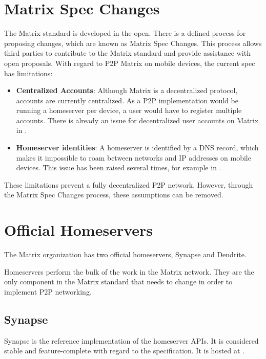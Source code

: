 \section{Matrix Spec Changes}
The Matrix standard is developed in the open.
There is a defined process for proposing changes, which are known as Matrix Spec Changes\cite{matrix_org_spec_changes}.
This process allows third parties to contribute to the Matrix standard and provide assistance with open proposals.
With regard to \ac{P2P} Matrix on mobile devices, the current spec has limitations:
\begin{itemize}
      \item{
            \textbf{Centralized Accounts}:
            Although Matrix is a decentralized protocol, accounts are currently centralized.
            As a \ac{P2P} implementation would be running a homeserver per device, a user would have to register multiple accounts.
            There is already an issue for decentralized user accounts on Matrix in .
            }
      \item{
            \textbf{Homeserver identities}:
            A homeserver is identified by a DNS record, which makes it impossible to roam between networks and IP addresses on mobile devices.
            This issue has been raised several times, for example in .
            }
\end{itemize}

These limitations prevent a fully decentralized \ac{P2P} network.
However, through the Matrix Spec Changes process, these assumptions can be removed.

\section{Official Homeservers}\label{sec:official_homeservers}
The Matrix organization has two official homeservers, Synapse\cite{matrix_org_synapse} and Dendrite\cite{matrix_org_dendrite}.

Homeservers perform the bulk of the work in the Matrix network.
They are the only component in the Matrix standard that needs to change in order to implement \ac{P2P} networking\cite{fosdem_event_p2p_matrix}.

\subsection{Synapse}
Synapse is the reference implementation of the homeserver \ac{API}s.
It is considered stable and feature-complete with regard to the specification.
It is hosted at .

